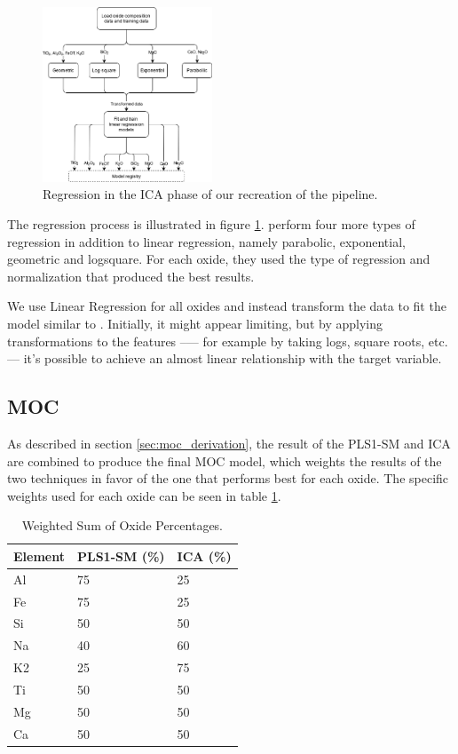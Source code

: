 \begin{figure}
	\centering
	\includegraphics[width=0.45\textwidth]{images/ica_regression.png}
	\caption{Regression in the ICA phase of our recreation of the pipeline.}
	\label{fig:ica_regression}
\end{figure}

The regression process is illustrated in figure \ref{fig:ica_regression}.
\citet{cleggRecalibrationMarsScience2017} perform four more types of regression in addition to linear regression, namely parabolic, exponential, geometric and logsquare.
For each oxide, they used the type of regression and normalization that produced the best results.

We use Linear Regression for all oxides and instead transform the data to fit the model similar to \citet{kuo_detecting_2018}.
Initially, it might appear limiting, but by applying transformations to the features --— for example by taking logs, square roots, etc. --- it's possible to achieve an almost linear relationship with the target variable.

\subsection{MOC}\label{sec:methodology_moc}
As described in section \ref{sec:moc_derivation}, the result of the PLS1-SM and ICA are combined to produce the final MOC model, which weights the results of the two techniques in favor of the one that performs best for each oxide.
The specific weights used for each oxide can be seen in table \ref{tab:weighted_sum_oxide}.

\begin{table}[h]
\centering
\begin{tabular*}{\columnwidth}{@{\extracolsep{\fill}}lll}
\toprule
Element  & PLS1-SM (\%) & ICA (\%) \\ \midrule
Al       & 75           & 25      \\
Fe       & 75           & 25      \\
Si       & 50           & 50      \\
Na       & 40           & 60      \\
K2       & 25           & 75      \\
Ti       & 50           & 50      \\
Mg       & 50           & 50      \\
Ca       & 50           & 50      \\
\bottomrule
\end{tabular*}
\caption{Weighted Sum of Oxide Percentages.}
\label{tab:weighted_sum_oxide}
\end{table}